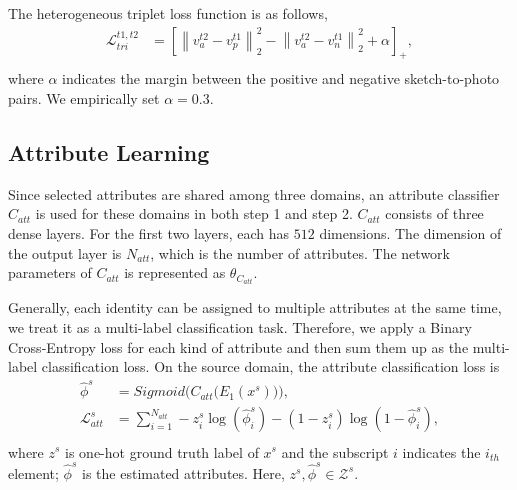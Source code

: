 \documentclass[journal]{IEEEtran}
\begin{document}
The heterogeneous triplet loss function is as follows,
\begin{equation}
\begin{split}
\mathcal{L}^{t1,t2}_{tri} &= \left [ \left \| v^{t2}_{a} -  v^{t1}_{p} \right \|_2^2 - \left \| v^{t2}_{a} -  v^{t1}_{n} \right \|_2^2 + \alpha \right ]_{+},\\
\end{split}
\end{equation}
where $\alpha$ indicates the margin between the positive and negative sketch-to-photo pairs. We empirically set $\alpha=0.3$.



\subsection{Attribute Learning}

Since selected attributes are shared among three domains, an attribute classifier $C_{att}$ is used for these domains in both step 1 and step 2. $C_{att}$ consists of three dense layers. For the first two layers, each has $512$ dimensions. The dimension of the output layer is $N_{att}$, which is the number of attributes. The network parameters of $C_{att}$ is represented as $\theta_{C_{att}}$.

Generally, each identity can be assigned to multiple attributes at the same time, we treat it as a multi-label classification task. Therefore, we apply a Binary Cross-Entropy loss for each kind of attribute and then sum them up as the multi-label classification loss. On the source domain, the attribute classification loss is 
\begin{equation}
\begin{split}
\hat{\phi}^{s} &=  Sigmoid \bigg(  C_{att} \big(E_{1}(x^{s}) \big) \bigg), \\
\mathcal{L}_{att}^{s} &= \sum_{i = 1}^{N_{att}}
-z_{i}^{s} \log (\hat{\phi}^{s}_{i}) - (1-z_{i}^{s}) \log ( 1- \hat{\phi}^{s}_{i}),\\
\end{split}
\end{equation}
where $z^{s}$ is one-hot ground truth label of $x^s$ and the subscript $i$ indicates the $i_{th}$ element; $\hat{\phi}^{s}$ is the estimated attributes. Here, $z^{s}, \hat{\phi}^{s} \in \mathcal{Z}^{s}$.
\end{document}

